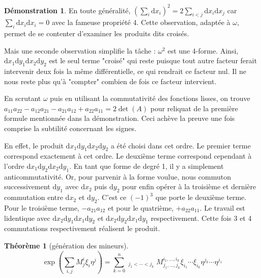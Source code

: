 \documentclass{article}
\theoremstyle{definition} %
\newtheorem{thm}{Théorème}
\newtheorem{dem}{Démonstration}
\newcommand{\dd}{ \mathrm{d}}
\newcommand{\1}{\mathbb{1}} %
\begin{document}
\begin{dem}
En toute généralité, $(\sum_i \dd x_i)^2= 2 \sum_{i<j} \dd x_i \dd x_j$ car $\sum_i \dd x_i \dd x_i =0$ avec la fameuse propriété 4.
Cette observation, adaptée à $\omega$, permet de se contenter d'examiner les produits dits croisés.


Mais une seconde observation simplifie la tâche : $\omega^2$ est une 4-forme.
Ainsi, $\dd x_1 \dd y_1 \dd x_2 \dd y_2$ est le seul terme "croisé" qui reste puisque tout autre facteur ferait intervenir deux fois la même différentielle, ce qui rendrait ce facteur nul.
Il ne nous reste plus qu'à "compter" combien de fois ce facteur intervient.


En scrutant $\omega$ puis en utilisant la commutativité des fonctions lisses, on trouve $a_{11} a_{22} - a_{12} a_{21} - a_{21} a_{12} + a_{22} a_{11} = 2 \det(A) $ pour reliquat de la première formule mentionnée dans la démonstration.
Ceci achève la preuve une fois comprise la subtilité concernant les signes.


En effet, le produit $\dd x_1 \dd y_1 \dd x_2 \dd y_2$ a été choisi dans cet ordre.
Le premier terme correspond exactement à cet ordre.
Le deuxième terme correspond cependant à l'ordre $\dd x_1 \dd y_2 \dd x_2 \dd y_1 $. En tant que forme de degré 1, il y a simplement anticommutativité.
Or, pour parvenir à la forme voulue, nous commuton successivement $\dd y_1$ avec $\dd x_2$ puis $\dd y_2$ pour enfin opérer à la troisième et dernière commutation entre $\dd x_2$ et $\dd y_2$. C'est ce $(-1)^3$ que porte le deuxième terme.
Pour le troisième terme, $- a_{21} a_{12}$ et pour le quatrième, $+ a_{22} a_{11}$. Le travail est lidentique avec $\dd x_2 \dd y_1 \dd x_1 \dd y_2$ et $ \dd x_2 \dd y_2 \dd x_1 \dd y_1$ respectivement.
Cette fois 3 et 4 commutations respectivement réalisent le produit.

\end{dem}


\begin{thm}[génération des mineurs]

$$\exp\left(\sum_{i,j} M^i_j\xi_i\eta^j\right)=\sum_{k=0}^n\mathop{\sum_{i_1<\cdots<i_k}}_{j_1<\cdots<j_k}M^{i_1,\ldots,i_k}_{j_1,\ldots,j_k}\xi_{i_1}\cdots \xi_{i_k}\eta^{j_k}\cdots\eta^{j_1}$$
\end{thm}
\end{document}

